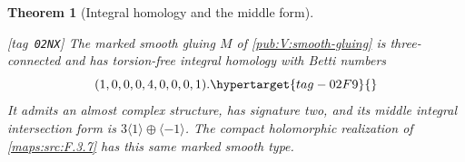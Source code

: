 \documentclass[11pt,a4paper]{article}
\numberwithin{equation}{section}
\newtheorem{theorem}{Theorem}[section]
\theoremstyle{definition}
\newcommand{\StatementRecord}[4]{{\upshape\footnotesize[tag~\texttt{#3}]}\enspace\ignorespaces}
\begin{document}
\begin{theorem}[Integral homology and the middle form]
\hypertarget{tag-02NW}{}\label{maps:src:F.2.5}
\hypertarget{tag-02NX}{}\label{maps:src:F.2.6}
\hypertarget{tag-02QL}{}\label{night:P1.12}
\StatementRecord{maps:src:F.2.6}{proved}{02NX}{\cref{pub:V:smooth-gluing}, \cref{pub:V:integral-restrictions}, \cref{mapsaudit:order-four-torsion-transgression}, \cref{sec:V-known-inputs}, \cref{maps:src:F.3.7}}
The marked smooth gluing $M$ of \cref{pub:V:smooth-gluing} is
three-connected and has torsion-free integral homology with Betti numbers
\begin{equation}
 (1,0,0,0,4,0,0,0,1).
 \hypertarget{tag-02F9}{}\label{maps:eq:F.5}
\end{equation}
It admits an almost complex structure, has signature two, and its
middle integral intersection form is
$3\langle1\rangle\oplus\langle-1\rangle$.
The compact holomorphic realization of \cref{maps:src:F.3.7}
has this same marked smooth type.
\end{theorem}
\end{document}
